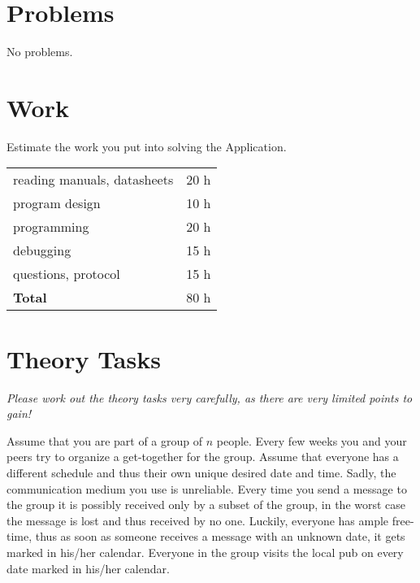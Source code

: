\documentclass[12pt,a4paper,titlepage,oneside]{article}
\begin{document}
\section{Problems}

No problems.

\section{Work}

Estimate the work you put into solving the Application.

\begin{tabular}{|l|c|}
\hline
reading manuals, datasheets	& 20 h	\\
program design			& 10 h	\\
programming			& 20 h	\\
debugging			& 15 h	\\
questions, protocol		& 15 h	\\
\hline
{\bf Total}			& 80 h	\\
\hline
\end{tabular}

\section{Theory Tasks}



\emph{Please work out the theory tasks very carefully, as there are very
	limited points to gain!}

\noindent
Assume that you are part of a group of $n$ people.
Every few weeks you and your peers try to organize a get-together for the
group.
Assume that everyone has a different schedule and thus their own unique
desired date and time.
Sadly, the communication medium you use is unreliable.
Every time you send a message to the group it is possibly received only by a
subset of the group, in the worst case the message is lost and thus received
by no one.
Luckily, everyone has ample free-time, thus as soon as someone receives a
message with an unknown date, it gets marked in his/her calendar.
Everyone in the group visits the local pub on every date marked in his/her
calendar.
\end{document}
